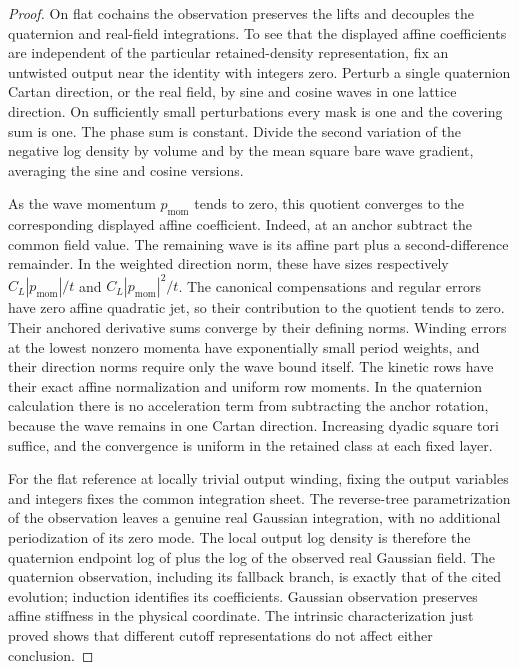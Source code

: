 \begin{proof}
On flat cochains the observation preserves the lifts and decouples the
quaternion and real-field integrations.  To see that the displayed
affine coefficients are independent of the particular retained-density
representation, fix an untwisted output near the identity with integers
zero.  Perturb a single quaternion Cartan direction, or the real field,
by sine and cosine waves in one lattice direction.  On sufficiently
small perturbations every mask is one and the covering sum is one.
The phase sum is constant.  Divide the second variation of the negative log
density by volume and by the mean square bare wave gradient, averaging
the sine and cosine versions.

As the wave momentum $p_{\mathrm{mom}}$ tends to zero, this quotient
converges to the corresponding displayed affine coefficient.  Indeed,
at an anchor subtract the common field value.  The remaining wave is
its affine part plus a second-difference remainder.  In the weighted
direction norm, these have sizes respectively
$C_L|p_{\mathrm{mom}}|/t$ and $C_L|p_{\mathrm{mom}}|^2/t$.
The canonical compensations and regular errors have zero affine
quadratic jet, so their contribution to the quotient tends to zero.
Their anchored derivative sums converge by their defining norms.
Winding errors at the lowest nonzero momenta have exponentially small
period weights, and their direction norms require only the wave bound
itself.  The kinetic rows have their exact affine normalization and
uniform row moments.  In the quaternion calculation there is no
acceleration term from subtracting the anchor rotation, because the
wave remains in one Cartan direction.  Increasing dyadic square tori
suffice, and the convergence is uniform in the retained class at each
fixed layer.

For the flat reference at locally trivial output winding, fixing the
output variables and integers fixes the common integration sheet.
The reverse-tree parametrization of the observation leaves a genuine
real Gaussian integration, with no additional periodization of its
zero mode.  The local output log density is therefore the quaternion
endpoint log of \cite{SharpO4} plus the log of the observed real Gaussian
field.  The quaternion observation, including its fallback branch, is
exactly that of the cited evolution; induction identifies its
coefficients.  Gaussian observation preserves affine stiffness in the
physical coordinate.  The intrinsic characterization just proved shows
that different cutoff representations do not affect either conclusion.


\end{proof}
